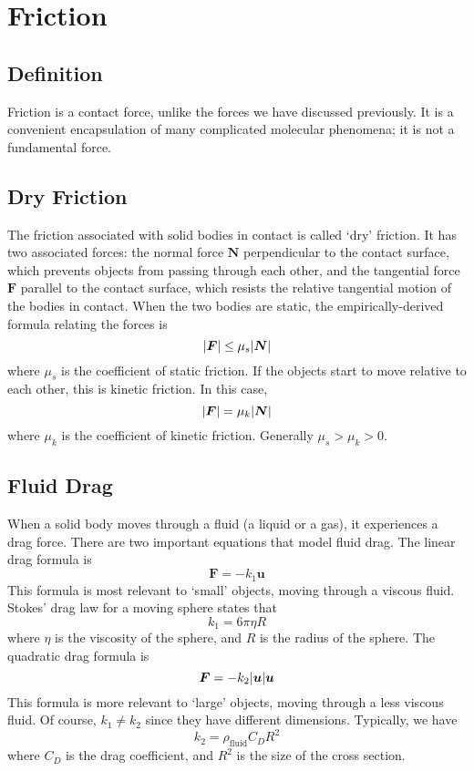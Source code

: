 \documentclass{article}
\begin{document}
\section{Friction}
\subsection{Definition}
Friction is a contact force, unlike the forces we have discussed previously. It is a convenient encapsulation of many complicated molecular phenomena; it is not a fundamental force.

\subsection{Dry Friction}
The friction associated with solid bodies in contact is called `dry' friction. It has two associated forces: the normal force $\bm N$ perpendicular to the contact surface, which prevents objects from passing through each other, and the tangential force $\bm F$ parallel to the contact surface, which resists the relative tangential motion of the bodies in contact. When the two bodies are static, the empirically-derived formula relating the forces is
\[ \abs{\bm F} \leq \mu_s \abs{\bm N} \]
where $\mu_s$ is the coefficient of static friction. If the objects start to move relative to each other, this is kinetic friction. In this case,
\[ \abs{\bm F} = \mu_k \abs{\bm N} \]
where $\mu_k$ is the coefficient of kinetic friction. Generally $\mu_s > \mu_k > 0$.

\subsection{Fluid Drag}
When a solid body moves through a fluid (a liquid or a gas), it experiences a drag force. There are two important equations that model fluid drag. The linear drag formula is
\[ \bm F = -k_1 \bm u \]
This formula is most relevant to `small' objects, moving through a viscous fluid. Stokes' drag law for a moving sphere states that
\[ k_1 = 6 \pi \eta R \]
where $\eta$ is the viscosity of the sphere, and $R$ is the radius of the sphere. The quadratic drag formula is
\[ \bm F = -k_2 \abs{\bm u} \bm u \]
This formula is more relevant to `large' objects, moving through a less viscous fluid. Of course, $k_1 \neq k_2$ since they have different dimensions. Typically, we have
\[ k_2 = \rho_{\text{fluid}} C_D R^2 \]
where $C_D$ is the drag coefficient, and $R^2$ is the size of the cross section.
\end{document}
